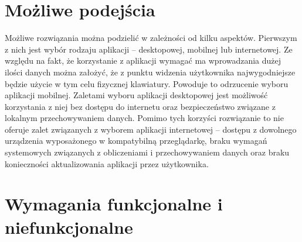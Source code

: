 \section{Możliwe podejścia}
Możliwe rozwiązania można podzielić w zależności od kilku aspektów. Pierwszym z nich jest wybór rodzaju aplikacji -- desktopowej, mobilnej lub internetowej. Ze względu na fakt, że korzystanie z aplikacji wymagać ma wprowadzania dużej ilości danych można założyć, że z punktu widzenia użytkownika najwygodniejsze będzie użycie w tym celu fizycznej klawiatury. Powoduje to odrzucenie wyboru aplikacji mobilnej. Zaletami  wyboru aplikacji desktopowej jest możliwość korzystania z niej bez dostępu do internetu oraz bezpieczeństwo związane z lokalnym przechowywaniem danych. Pomimo tych korzyści rozwiązanie to nie oferuje zalet związanych z wyborem aplikacji internetowej -- dostępu z dowolnego urządzenia wyposażonego w kompatybilną przeglądarkę, braku wymagań systemowych związanych z obliczeniami i przechowywaniem danych oraz braku konieczności aktualizowania aplikacji przez użytkownika.
\section{Wymagania funkcjonalne i niefunkcjonalne}